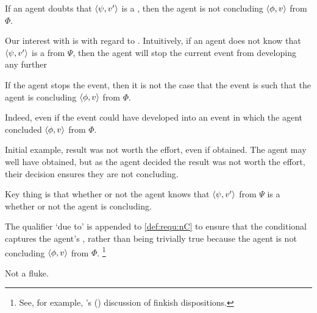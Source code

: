 \begin{note}
  If an agent doubts that \(\langle \psi, v' \rangle\) is a \fc{}, then the agent is not concluding \(\langle \phi, v \rangle\) from \(\Phi\).
\end{note}

\begin{note}
  Our interest with  is with regard to .
  Intuitively, if an agent does not know that \(\langle \psi, v' \rangle\) is a \fc{} from \(\Psi\), then the agent will stop the current event from developing any further

  If the agent stops the event, then it is not the case that the event is such that the agent is concluding \(\langle \phi, v \rangle\) from \(\Phi\).

  Indeed, even if the event could have developed into an event in which the agent concluded \(\langle \phi, v \rangle\) from \(\Phi\).

  Initial example, result was not worth the effort, even if obtained.
  The agent may well have obtained, but as the agent decided the result was not worth the effort, their decision ensures they are not concluding.
\end{note}

\begin{note}
  Key thing is that whether or not the agent knows that \(\langle \psi, v' \rangle\) from \(\Psi\) is a \fc{}  whether or not the agent is concluding.
\end{note}

\begin{note}
  The qualifier `due to' is appended to \ref{def:requ:nC} to ensure that the conditional captures the agent's \ninf{}, rather than being trivially true because the agent is not concluding \(\langle \phi, v \rangle\) from \(\Phi\).%
  \footnote{
    See, for example, \citeauthor{Lewis:1997wg}'s (\citeyear{Lewis:1997wg}) discussion of finkish dispositions.
  }
\end{note}

\begin{note}
  \color{red}
  Not a fluke.
\end{note}


